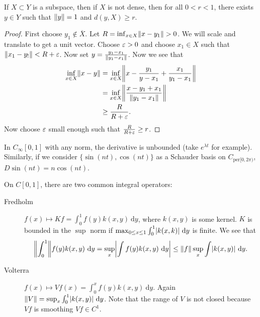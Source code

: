 \documentclass[10pt, twoside]{article}
\renewcommand{\d}{\ \mathrm{d}}
\begin{document}
    \begin{lem}[Riesz]
        If $X \subset Y$ is a subspace, then if $X$ is not dense, then for all $0 < r < 1$, there exists $y \in Y$ such that $\lVert y\rVert = 1$ and $d(y,X) \geq r$.
        \begin{proof}
            First choose $y_1 \not\in \overline{X}$. Let $R = \inf_{x \in X} \lVert x-y_1\rVert > 0$. We will scale and translate to get a unit vector. Choose $\varepsilon > 0$ and choose $x_1 \in X$ such that $\lVert x_1-y_!\rVert < R+\varepsilon$. Now set $y = \frac{y_1-x_1}{\lVert y_1-x_1\rVert}$. Now we see that
            \begin{align*}
                \inf_{x \in X} \norm{x-y} &= \inf_{x \in X} \norm*{x - \frac{y_1}{y-x_1} + \frac{x_1}{y_1-x_1}} \\
                                          &= \inf_{x \in X} \norm*{\frac{x-y_1+x_1}{\norm{y_1-x_1}}} \\
                                          &\geq \frac{R}{R+\ep}.
            \end{align*}
            Now choose $\varepsilon$ small enough such that $\frac{R}{R+\varepsilon} \geq r$.
        \end{proof}
    \end{lem}
   
    \begin{exm}
        In $C_{\infty}[0,1]$ with any norm, the derivative is unbounded (take $e^{\lambda t}$ for example). Similarly, if we consider $\{\sin(nt), \cos(nt)\}$ as a Schauder basis on $C_{\mathrm{per}[0,2\pi)}$,
        $D \sin(nt) = n\cos(nt)$.
    \end{exm}

    \begin{exm}
        On $C[0,1]$, there are two common integral operators:
        \begin{description}
            \item[Fredholm] $f(x) \mapsto Kf = \int_0^1 f(y)k(x,y)\d y$, where $k(x,y)$ is some kernel. $K$ is bounded in the $\sup$ norm if $\max_{0 \leq x \leq 1} \int_0^1 \abs{k(x,k)}\d y$ is finite. We see that\[ \norm*{\int_0^1} f(y)k(x,y)\d y = \sup_x \abs*{\int f(y) k(x,y) \d y} \leq \norm{f} \sup_x \int \abs{k(x,y)} \d y. \]
            \item[Volterra] $f(x) \mapsto Vf(x) = \int_0^x f(y) k(x,y) \d y$. Again $\norm{V} = \sup_x \int_0^1 \abs{k(x,y)} \d y$. Note that the range of $V$ is not closed because $Vf$ is smoothing $Vf \in C^1$.
        \end{description}
    \end{exm}
\end{document}
